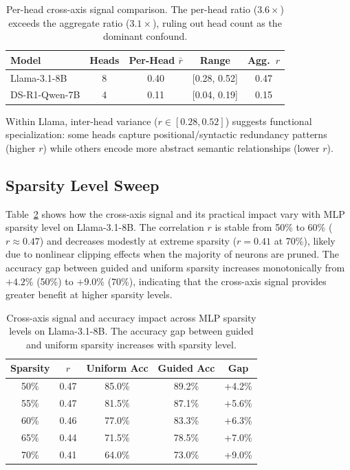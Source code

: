 \documentclass[11pt,a4paper]{article}
\begin{document}
\begin{table}[t]
\centering
\small
\begin{tabular}{lcccc}
\toprule
\textbf{Model} & \textbf{Heads} & \textbf{Per-Head $\bar{r}$} & \textbf{Range} & \textbf{Agg.\ $r$} \\
\midrule
Llama-3.1-8B     & 8 & 0.40 & [0.28, 0.52] & 0.47 \\
DS-R1-Qwen-7B    & 4 & 0.11 & [0.04, 0.19] & 0.15 \\
\bottomrule
\end{tabular}
\caption{Per-head cross-axis signal comparison. The per-head ratio ($3.6\times$) exceeds the aggregate ratio ($3.1\times$), ruling out head count as the dominant confound.}
\label{tab:perhead}
\end{table}

Within Llama, inter-head variance ($r \in [0.28, 0.52]$) suggests functional specialization: some heads capture positional/syntactic redundancy patterns (higher $r$) while others encode more abstract semantic relationships (lower $r$).

\subsection{Sparsity Level Sweep}
\label{sec:sparsity_sweep}

Table~\ref{tab:sparsity_sweep} shows how the cross-axis signal and its practical impact vary with MLP sparsity level on Llama-3.1-8B.
The correlation $r$ is stable from 50\% to 60\% ($r{\approx}0.47$) and decreases modestly at extreme sparsity ($r{=}0.41$ at 70\%), likely due to nonlinear clipping effects when the majority of neurons are pruned.
The accuracy gap between guided and uniform sparsity increases monotonically from $+4.2\%$ (50\%) to $+9.0\%$ (70\%), indicating that the cross-axis signal provides greater benefit at higher sparsity levels.

\begin{table}[t]
\centering
\small
\begin{tabular}{ccccc}
\toprule
\textbf{Sparsity} & \textbf{$r$} & \textbf{Uniform Acc} & \textbf{Guided Acc} & \textbf{Gap} \\
\midrule
50\% & 0.47 & 85.0\% & 89.2\% & +4.2\% \\
55\% & 0.47 & 81.5\% & 87.1\% & +5.6\% \\
60\% & 0.46 & 77.0\% & 83.3\% & +6.3\% \\
65\% & 0.44 & 71.5\% & 78.5\% & +7.0\% \\
70\% & 0.41 & 64.0\% & 73.0\% & +9.0\% \\
\bottomrule
\end{tabular}
\caption{Cross-axis signal and accuracy impact across MLP sparsity levels on Llama-3.1-8B. The accuracy gap between guided and uniform sparsity increases with sparsity level.}
\label{tab:sparsity_sweep}
\end{table}
\end{document}

